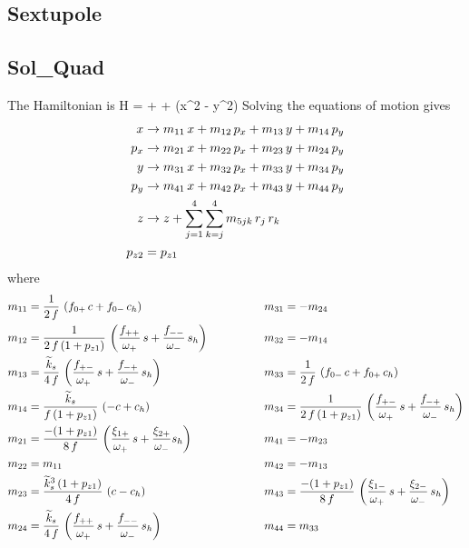 \documentclass{book}
\begin{document}
\subsection{Sextupole}

\subsection{Sol\_Quad}

The Hamiltonian is
\Begineq
  H =  + 
   +  (x^2 - y^2)
\Endeq
Solving the equations of motion gives
\begin{align}
  x   &\rightarrow m_{11} \, x + m_{12} \, p_x + m_{13} \, y + m_{14} \, p_y \nonumber \\
  p_x &\rightarrow m_{21} \, x + m_{22} \, p_x + m_{23} \, y + m_{24} \, p_y \nonumber \\
  y   &\rightarrow m_{31} \, x + m_{32} \, p_x + m_{33} \, y + m_{34} \, p_y \nonumber \\
  p_y &\rightarrow m_{41} \, x + m_{42} \, p_x + m_{43} \, y + m_{44} \, p_y \nonumber \\
  z   &\rightarrow z + \sum_{j = 1}^4 \sum_{k = j}^4 m_{5jk} \, r_j \, r_k  \nonumber \\
  p_{z2} &= p_{z1} \nonumber
\end{align}
where
\begin{alignat}{2}
  m_{11} &= \frac{1}{2 \, f} \, \left( f_{0+} \, c + f_{0-} \, c_h \right) & \qquad \qquad
  m_{31} &= -m_{24} \nonumber \\
  m_{12} &= \frac{1}{2 \, f \, (1 + p_{z1})} \, 
            \left( \frac{f_{++}}{\omega_+} \,  s + \frac{f_{--}}{\omega_-} \, s_h \right) & \qquad \qquad
  m_{32} &= -m_{14} \nonumber \\
  m_{13} &= \frac{\widetilde k_s}{4 \, f} \, 
            \left( \frac{f_{+-}}{\omega_+} \, s +\frac{f_{-+}}{\omega_-} \, s_h \right) & \qquad \qquad
  m_{33} &= \frac{1}{2 \, f} \, \left( f_{0-} \, c + f_{0+} \, c_h \right) \nonumber \\
  m_{14} &= \frac{\widetilde k_s}{f \, (1 + p_{z1})} \, \left( -c + c_h \right) & \qquad \qquad
  m_{34} &= \frac{1}{2 \, f \, (1 + p_{z1})} \, 
            \left( \frac{f_{+-}}{\omega_+} \, s + \frac{f_{-+}}{\omega_-} \, s_h \right) \nonumber \\
  m_{21} &= \frac{-(1 + p_{z1})}{8 \, f} \, 
            \left( \frac{\xi_{1+}}{\omega_+} \, s + \frac{\xi_{2+}}{\omega_-} s_h \right) & \qquad \qquad
  m_{41} &= -m_{23} \nonumber \\
  m_{22} &= m_{11} & \qquad \qquad
  m_{42} &= -m_{13} \nonumber \\
  m_{23} &= \frac{\widetilde k_s^3 \, (1 + p_{z1})}{4 \, f} \, \left( c - c_h \right) & \qquad \qquad
  m_{43} &= \frac{-(1 + p_{z1})}{8 \, f} \, 
            \left( \frac{\xi_{1-}}{\omega_+} \, s + \frac{\xi_{2-}}{\omega_-} \, s_h \right) \nonumber \\
  m_{24} &= \frac{\widetilde k_s}{4 \, f} \, 
            \left( \frac{f_{++}}{\omega_+} \, s + \frac{f_{--}}{\omega_-} \, s_h \right) & \qquad \qquad
  m_{44} &= m_{33} \nonumber
\end{alignat}
\end{document}
